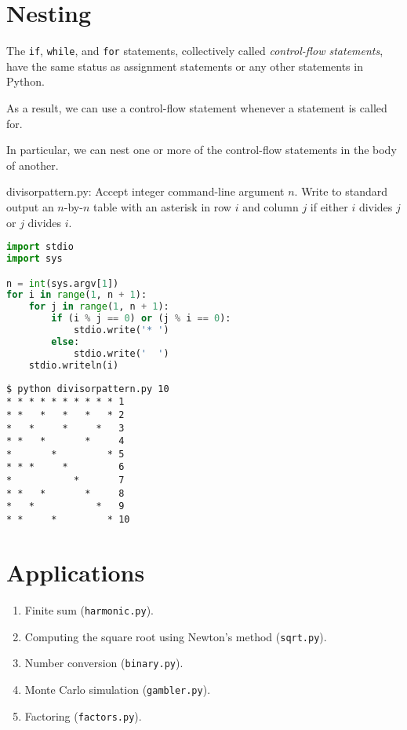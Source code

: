 \documentclass[8pt,a4paper,compress,handout]{beamer}
\begin{document}
\section{Nesting}
\begin{frame}[fragile]
The \lstinline{if}, \lstinline{while}, and \lstinline{for} statements, collectively called \emph{control-flow statements}, have the same status as assignment statements or any other statements in Python.

\bigskip

As a result, we can use a control-flow statement whenever a statement is called for. 

\bigskip

In particular, we can nest one or more of the control-flow statements in the body of another. 
\end{frame}

\begin{frame}[fragile]
\begin{framed}
\tiny divisorpattern.py: Accept integer command-line argument $n$. Write to standard output an $n$-by-$n$ table with an asterisk in row $i$ and column $j$ if either $i$ divides $j$ or $j$ divides $i$.
\end{framed}

\begin{lstlisting}[language=Python]
import stdio
import sys

n = int(sys.argv[1])
for i in range(1, n + 1):
    for j in range(1, n + 1):
        if (i % j == 0) or (j % i == 0):
            stdio.write('* ')
        else:
            stdio.write('  ')
    stdio.writeln(i)
\end{lstlisting}

\begin{lstlisting}[language={}]
$ python divisorpattern.py 10
* * * * * * * * * * 1
* *   *   *   *   * 2
*   *     *     *   3
* *   *       *     4
*       *         * 5
* * *     *         6
*           *       7
* *   *       *     8
*   *           *   9
* *     *         * 10
\end{lstlisting}
\end{frame}

\section{Applications}
\begin{frame}[fragile]
\begin{enumerate}
\item Finite sum (\lstinline{harmonic.py}).

\item Computing the square root using Newton's method (\lstinline{sqrt.py}).

\item Number conversion (\lstinline{binary.py}).

\item Monte Carlo simulation (\lstinline{gambler.py}).

\item Factoring (\lstinline{factors.py}).
\end{enumerate}
\end{frame}
\end{document}
